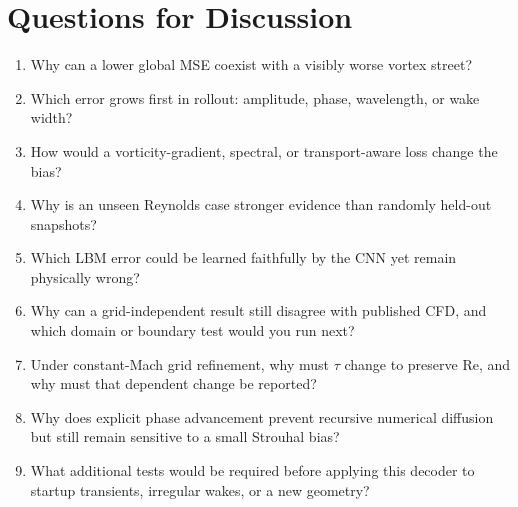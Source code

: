 \documentclass[11pt]{article}
\newcommand{\Rey}{\mathrm{Re}}
\begin{document}
\section{Questions for Discussion}
\begin{enumerate}
\item Why can a lower global MSE coexist with a visibly worse vortex street?
\item Which error grows first in rollout: amplitude, phase, wavelength, or wake width?
\item How would a vorticity-gradient, spectral, or transport-aware loss change the bias?
\item Why is an unseen Reynolds case stronger evidence than randomly held-out snapshots?
\item Which LBM error could be learned faithfully by the CNN yet remain physically wrong?
\item Why can a grid-independent result still disagree with published CFD, and
which domain or boundary test would you run next?
\item Under constant-Mach grid refinement, why must $\tau$ change to preserve
$\Rey$, and why must that dependent change be reported?
\item Why does explicit phase advancement prevent recursive numerical
diffusion but still remain sensitive to a small Strouhal bias?
\item What additional tests would be required before applying this decoder to
startup transients, irregular wakes, or a new geometry?
\end{enumerate}
\end{document}
